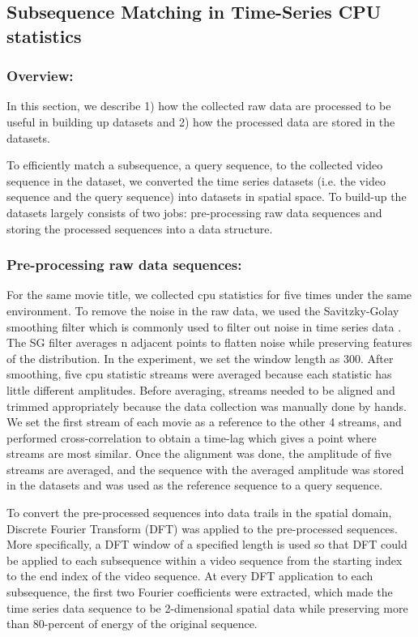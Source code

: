 \subsection{Subsequence Matching in Time-Series CPU statistics}
\label{sec:kookjin}

\subsubsection{Overview:}
In this section, we describe 1) how the collected raw data are processed to be useful in building up datasets and 2) how the processed data are stored in the datasets.

To efficiently match a subsequence, a query sequence, to the collected video sequence in the dataset, we converted the time series datasets (i.e. the video sequence and the query sequence) into datasets in spatial space. To build-up the datasets largely consists of two jobs: pre-processing raw data sequences and storing the processed sequences into a data structure.

\subsubsection{Pre-processing raw data sequences:}
For the same movie title, we collected cpu statistics for five times under the same environment. To remove the noise in the raw data, we used the Savitzky-Golay smoothing filter which is commonly used to filter out noise in time series data \cite{SGfilter}. The SG filter averages n adjacent points to flatten noise while preserving features of the distribution. In the experiment, we set the window length as 300. After smoothing, five cpu statistic streams were averaged because each statistic has little different amplitudes. Before averaging, streams needed to be aligned and trimmed appropriately because the data collection was manually done by hands. We set the first stream of each movie as a reference to the other 4 streams, and performed cross-correlation to obtain a time-lag which gives a point where streams are most similar. Once the alignment was done, the amplitude of five streams are averaged, and the sequence with the averaged amplitude was stored in the datasets and was used as the reference sequence to a query sequence.

To convert the pre-processed sequences into data trails in the spatial domain, Discrete Fourier Transform (DFT) was applied to the pre-processed sequences. More specifically, a  DFT window of a specified length is used so that DFT could be applied to each subsequence within a video sequence from the starting index to the end index of the video sequence. At every DFT application to each subsequence, the first two Fourier coefficients were extracted, which made the time series data sequence to be 2-dimensional spatial data while preserving more than 80-percent of energy of the original sequence.

